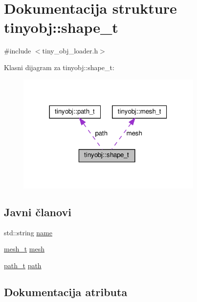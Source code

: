 \hypertarget{structtinyobj_1_1shape__t}{}\section{Dokumentacija strukture tinyobj\+:\+:shape\+\_\+t}
\label{structtinyobj_1_1shape__t}


{\ttfamily \#include $<$tiny\+\_\+obj\+\_\+loader.\+h$>$}



Klasni dijagram za tinyobj\+:\+:shape\+\_\+t\+:
\nopagebreak
\begin{figure}[H]
\begin{center}
\leavevmode
\includegraphics[width=260pt]{structtinyobj_1_1shape__t__coll__graph}
\end{center}
\end{figure}
\subsection*{Javni članovi}
\begin{DoxyCompactItemize}
\item 
std\+::string \hyperlink{structtinyobj_1_1shape__t_a98650e2e66d00934f68de88eafb34630}{name}
\item 
\hyperlink{structtinyobj_1_1mesh__t}{mesh\+\_\+t} \hyperlink{structtinyobj_1_1shape__t_a3dacb06dfbfe9e245ff4bc7b5b3d9818}{mesh}
\item 
\hyperlink{structtinyobj_1_1path__t}{path\+\_\+t} \hyperlink{structtinyobj_1_1shape__t_a3e25b80e1330260be137eb865ec0b958}{path}
\end{DoxyCompactItemize}


\subsection{Dokumentacija atributa}
\mbox{\label{structtinyobj_1_1shape__t_a3dacb06dfbfe9e245ff4bc7b5b3d9818}} 
